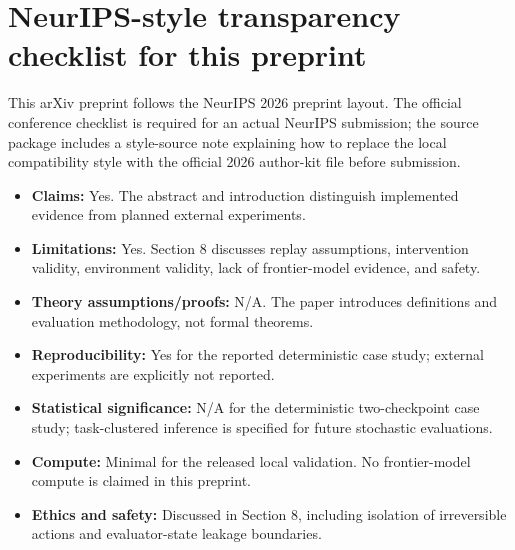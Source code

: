 \documentclass{article}
\begin{document}
\section{NeurIPS-style transparency checklist for this preprint}
This arXiv preprint follows the NeurIPS 2026 preprint layout. The official conference checklist is required for an actual NeurIPS submission; the source package includes a style-source note explaining how to replace the local compatibility style with the official 2026 author-kit file before submission.

\begin{itemize}
  \item \textbf{Claims:} Yes. The abstract and introduction distinguish implemented evidence from planned external experiments.
  \item \textbf{Limitations:} Yes. Section 8 discusses replay assumptions, intervention validity, environment validity, lack of frontier-model evidence, and safety.
  \item \textbf{Theory assumptions/proofs:} N/A. The paper introduces definitions and evaluation methodology, not formal theorems.
  \item \textbf{Reproducibility:} Yes for the reported deterministic case study; external experiments are explicitly not reported.
  \item \textbf{Statistical significance:} N/A for the deterministic two-checkpoint case study; task-clustered inference is specified for future stochastic evaluations.
  \item \textbf{Compute:} Minimal for the released local validation. No frontier-model compute is claimed in this preprint.
  \item \textbf{Ethics and safety:} Discussed in Section 8, including isolation of irreversible actions and evaluator-state leakage boundaries.
\end{itemize}
\end{document}
